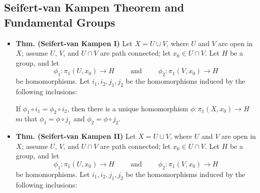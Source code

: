 \documentclass{article}
\begin{document}
	\subsection{Seifert-van Kampen Theorem and Fundamental Groups}
	\begin{itemize}
		\item \textbf{Thm. (Seifert-van Kampen I)} Let $X = U \cup V$, where $U$ and $V$ are open in $X$; assume $U$, $V$, and $U \cap V$ are path connected; let $x_0 \in U \cap V$. Let $H$ be a group, and let 
		\begin{equation*}
			\phi_1: \pi_1(U,x_{0}) \to H \qquad \text{ and } \qquad \phi_2 : \pi_1(V, x_0) \to H
		\end{equation*}
		be homomorphisms. Let $i_1, i_2, j_1, j_2$ be the homomorphisms induced by the following inclusions: 
		\begin{figure}[h!]
			\centering 
		\end{figure}
		
		If $\phi_1 \circ i_1 = \phi_2 \circ i_2$, then there is a unique homomorphism $\phi: \pi_1(X,x_0) \to H$ so that $\phi_1 = \phi \circ j_1$ and $\phi_2 = \phi \circ j_2$. 
		
		\item \textbf{Thm. (Seifert-van Kampen II)} Let $X = U \cup V$, where $U$ and $V$ are open in $X$; assume $U$, $V$, and $U \cap V$ are path connected; let $x_0 \in U \cap V$. Let $H$ be a group, and let 
		\begin{equation*}
			\phi_1: \pi_1(U,x_{0}) \to H \qquad \text{ and } \qquad \phi_2 : \pi_1(V, x_0) \to H
		\end{equation*}
		be homomorphisms. Let $i_1, i_2, j_1, j_2$ be the homomorphisms induced by the following inclusions: 
		\begin{figure}[h!]
			\centering 
		\end{figure} 
		

\end{itemize}
\end{document}
